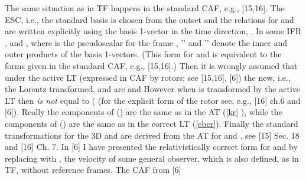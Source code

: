 \documentclass[a4paper,showpacs,preprintnumbers,amsmath,amssymb]{revtex4}
\begin{document}
The same situation as in TF happens in the standard CAF, e.g., [15,16]. The
ESC, i.e., the standard basis \myHighlight{$\left\{ \gamma _{\mu }\right\} ,$}\coordHE{} is chosen
from the outset and the relations for \coordHE{} and \coordHE{} are written explicitly
using the basis 1-vector in the time direction, \coordHE{}. In some IFR\coordHE{}  \coordHE{}, and \coordHE{}, where \coordHE{}
is the pseudoscalar for the frame \myHighlight{$\left\{ \gamma _{\mu }\right\} $}\coordHE{}, '\myHighlight{$\cdot
$}\coordHE{}' and '\myHighlight{$\wedge $}\coordHE{}' denote the inner and outer products of the basis
1-vectors. (This form for \coordHE{} and \coordHE{} is equivalent to the forms given in
the standard CAF, e.g., [15,16].) Then it is wrongly assumed that under the
active LT (expressed in CAF by rotors; see [15,16], [6]) the new, i.e., the
Lorentz transformed, \coordHE{} and \coordHE{} are \coordHE{} and \coordHE{} However when \coordHE{} is transformed by the
active LT then \coordHE{} \emph{is not} equal to (\coordHE{} (for the explicit form
of the rotor \coordHE{} see, e.g., [16] ch.6 and [6]). Really the components of \coordHE{}(\coordHE{}) are the same as in the AT (\ref{kr}%
), while the components of \coordHE{} (\coordHE{}) are the
same as in the correct LT (\ref{ebcr}). Finally the standard transformations
for the 3D \coordHE{} and \coordHE{} are derived from the AT for \coordHE{} and \coordHE{}, see [15] Sec. 18 and [16] Ch. 7.
In [6] I have presented the relativistically correct form for \coordHE{} and \coordHE{} by
replacing \coordHE{} with \coordHE{}, the velocity of some general observer,
which is also defined, as in TF, without reference frames. The CAF from [6]
\end{document}
